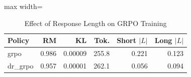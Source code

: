 \begin{table}[!htbp]
\centering

\scriptsize
\setlength{\tabcolsep}{3.4pt}
\begin{adjustbox}{max width=\linewidth}
\begin{tabular}{lrrrrr}
\toprule
Policy & RM & KL & Tok. & Short $|L|$ & Long $|L|$ \\
\midrule
grpo & 0.986 & 0.00009 & 255.8 & 0.221 & 0.123 \\
dr\_grpo & 0.957 & 0.00001 & 262.1 & 0.056 & 0.094 \\
\bottomrule
\end{tabular}

\end{adjustbox}
\caption{Effect of Response Length on GRPO Training}
\label{tab:grpo-norm}

\end{table}
